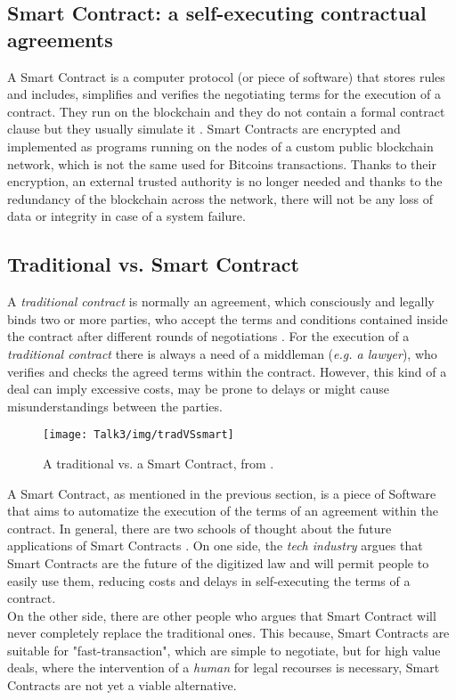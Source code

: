 \subsection{Smart Contract: a self-executing contractual agreements}
A Smart Contract is a computer protocol (or piece of software) that stores rules and includes, simplifies and verifies the negotiating terms for the execution of a contract. They run on the blockchain \cite{paper3} and they do not contain a formal contract clause but they usually simulate it \cite{SC1}. Smart Contracts are encrypted and implemented as programs running on the nodes of a custom public blockchain network, which is not the same used for Bitcoins transactions. Thanks to their encryption, an external trusted authority is no longer needed and thanks to the redundancy of the blockchain across the network, there will not be any loss of data or integrity in case of a system failure.

\subsection{Traditional vs. Smart Contract}
A \textit{traditional contract} is normally an agreement, which consciously and legally binds two or more parties, who accept the terms and conditions contained inside the contract after different rounds of negotiations \cite{SC12,SC13}. For the execution of a \textit{traditional contract} there is always a need of a middleman (\textit{e.g. a lawyer}), who verifies and checks the agreed terms within the contract. However, this kind of a deal can imply excessive costs, may be prone to delays or might cause misunderstandings between the parties. 
           \begin{figure}[H]
         \begin{center}
         \texttt{[image: Talk3/img/tradVSsmart]}
         \end{center}
         \caption{A traditional vs. a Smart Contract, from \cite{SC2}.}
         \label{label}
       \end{figure}
A Smart Contract, as mentioned in the previous section, is a piece of Software that aims to automatize the execution of the terms of an agreement within the contract.
In general, there are two schools of thought about the future applications of Smart Contracts \cite{future}. On one side, the \textit{tech industry} argues that Smart Contracts are the future of the digitized law and will permit people to easily use them, reducing costs and delays in self-executing the terms of a contract. \\
On the other side, there are other people who argues that Smart Contract will never completely replace the traditional ones. This because, Smart Contracts are suitable for "fast-transaction", which are simple to negotiate, but for high value deals, where the intervention of a \textit{human} for legal recourses is necessary, Smart Contracts are not yet a viable alternative.






